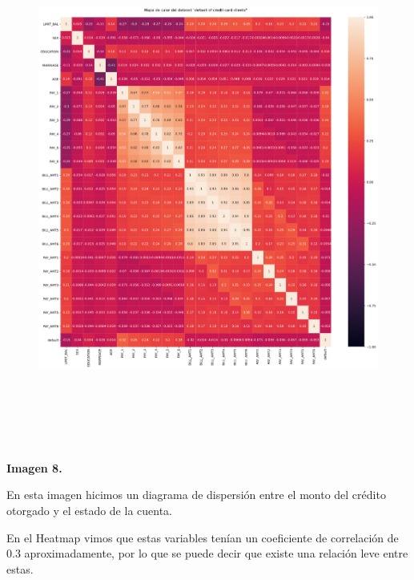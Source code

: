 \documentclass[12pt]{report}
\renewcommand{\_}{\kern-1.5pt\textunderscore\kern-1.5pt}
\begin{document}

\begin{figure}[H]
	\begin{Center}
		\includegraphics[width=6.27in,height=6.69in]{./media/image9.png}
	\end{Center}
\end{figure}




\vspace{\baselineskip}
\vspace{\baselineskip}
\vspace{\baselineskip}
\vspace{\baselineskip}
\vspace{\baselineskip}
\vspace{\baselineskip}
\vspace{\baselineskip}
\vspace{\baselineskip}
\begin{justify}
\textbf{Imagen 8.}
\end{justify}
\begin{justify}
En esta imagen hicimos un diagrama de dispersión entre el monto del crédito otorgado y el estado de la cuenta.
\end{justify}
\begin{justify}
En el Heatmap vimos que estas variables tenían un coeficiente de correlación de 0.3 aproximadamente, por lo que se puede decir que existe una relación leve entre estas.
\end{justify}
\end{document}
